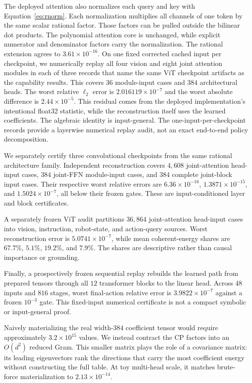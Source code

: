 \documentclass{article}
\begin{document}
The deployed attention also normalizes each query and key with Equation~\ref{eq:rnorm}.
Each normalization multiplies all channels of one token by the same scalar rational factor.
Those factors can be pulled outside the bilinear dot products. The polynomial attention core
is unchanged, while explicit numerator and denominator factors carry the normalization.
The rational extension agrees to $3.61\times10^{-16}$. On one fixed corrected cached input per checkpoint,
we numerically replay all four vision and eight joint attention modules in each of three records
that name the same ViT checkpoint artifacts as the capability results. This covers $36$
module-input cases and $384$ architectural heads. The worst relative $\ell_2$ error is
$2.016119\times10^{-7}$ and the worst absolute difference
is $2.44\times10^{-5}$. This residual comes from the deployed implementation's intentional
float32 statistic, while the reconstruction itself uses the learned coefficients. The algebraic
identity is input-general. The one-input-per-checkpoint records provide a layerwise numerical
replay audit, not an exact end-to-end policy decomposition.

We separately certify three convolutional checkpoints from the same rational architecture family.
Independent reconstruction covers $4{,}608$ joint-attention head-input cases, $384$ joint-FFN
module-input cases, and $384$ complete joint-block input cases. Their respective worst relative
errors are $6.36\times10^{-16}$, $1.3871\times10^{-15}$, and $1.5024\times10^{-7}$, all below
their frozen gates. These are input-conditioned layer and block certificates.

A separately frozen ViT audit partitions $36{,}864$ joint-attention head-input cases into vision,
instruction, robot-state, and action-query sources. Worst reconstruction error is
$5.0741\times10^{-7}$, while mean coherent-energy shares are $67.7\%$, $5.1\%$, $19.2\%$,
and $7.9\%$. The shares are descriptive rather than causal importance or grounding.

Finally, a prospectively frozen sequential replay rebuilds the learned path from prepared tensors
through all $12$ transformer blocks to the linear head. Across $48$ inputs and $816$ stages, worst
final-action relative error is $3.9822\times10^{-7}$ against a frozen $10^{-3}$ gate. This
fixed-input numerical certificate is not a compact symbolic or input-general proof.

Naively materializing the real width-$384$ coefficient tensor would require approximately
$3.2\times10^{15}$ values. We instead contract the CP factors into an $O(d^2)$ reduced Gram.
This smaller matrix plays the role of a covariance matrix: its leading eigenvectors rank the
directions that carry the most coefficient energy without constructing the full table. At toy
multi-head scale, it matches brute-force materialization to $2.13\times10^{-14}$.
\end{document}
